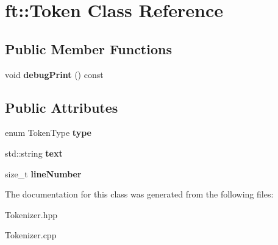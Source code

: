 \hypertarget{classft_1_1Token}{}\section{ft\+:\+:Token Class Reference}
\label{classft_1_1Token}
\subsection*{Public Member Functions}
\begin{DoxyCompactItemize}
\item 
\mbox{\label{classft_1_1Token_afd6b89b1e1048da35be93363afe02264}} 
void {\bfseries debug\+Print} () const
\end{DoxyCompactItemize}
\subsection*{Public Attributes}
\begin{DoxyCompactItemize}
\item 
\mbox{\label{classft_1_1Token_abc954888fb8baf6c5d46f8d2958ca8f6}} 
enum Token\+Type {\bfseries type}
\item 
\mbox{\label{classft_1_1Token_a12793419d5e1a1cb18a0a71044c2dd9f}} 
std\+::string {\bfseries text}
\item 
\mbox{\label{classft_1_1Token_afcd6040985cc8a1f54803461c64f33b1}} 
size\+\_\+t {\bfseries line\+Number}
\end{DoxyCompactItemize}


The documentation for this class was generated from the following files\+:\begin{DoxyCompactItemize}
\item 
Tokenizer.\+hpp\item 
Tokenizer.\+cpp\end{DoxyCompactItemize}
